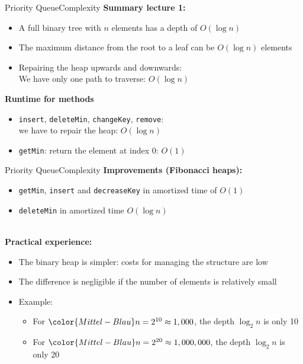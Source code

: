 \begin{frame}{Priority Queue}{Complexity}
  \textbf{Summary lecture 1:}
  \begin{itemize}
    \item<2->
      A full binary tree with {\color{Mittel-Blau}$n$} elements has a {\color{Mittel-Blau}depth} of
      {\color{Mittel-Blau}$O(\log n)$}
    \item<3->
      The maximum distance from the root to a leaf can be
      $O(\log n)$ elements
    \item<4->
      Repairing the heap upwards and downwards:\\
      We have only one path to traverse: {\color{Mittel-Blau}$O(\log n)$}
  \end{itemize}
  \textbf{Runtime for methods}
  \begin{itemize}
    \item<6->
      {\color{Mittel-Blau}\texttt{insert}},
      {\color{Mittel-Blau}\texttt{deleteMin}},
      {\color{Mittel-Blau}\texttt{changeKey}},
      {\color{Mittel-Blau}\texttt{remove}}:\\
      we have to repair the heap: {\color{Mittel-Blau}$O(\log n)$}
    \item<7->
      {\color{Mittel-Blau}\texttt{getMin}}:
      return the element at index 0: {\color{Mittel-Blau}$O(1)$}
  \end{itemize}
\end{frame}


\begin{frame}{Priority Queue}{Complexity}
  \textbf{Improvements (Fibonacci heaps):}
  \begin{itemize}
    \item<2->
      {\color{Mittel-Blau}\texttt{getMin}},
      {\color{Mittel-Blau}\texttt{insert}} and
      {\color{Mittel-Blau}\texttt{decreaseKey}}
      in amortized time of {\color{Mittel-Blau}$O(1)$}
    \item<3->
      {\color{Mittel-Blau}\texttt{deleteMin}}
      in amortized time {\color{Mittel-Blau}$O(\log n)$}
  \end{itemize}
  \hfill\\[0.5em]
  \textbf{Practical experience:}
  \begin{itemize}
    \item<5->
      The binary heap is simpler: costs for managing the structure are low
    \item<6->
      The difference is negligible if the number of elements is relatively small 
    \item<7->
      Example:
    \begin{itemize}
      \item
        For ${\color{Mittel-Blau}n = 2^{10}} \approx 1,000$, the
        {\color{Mittel-Blau}depth}
        $\log_2 n$ is only 10
      \item
        For ${\color{Mittel-Blau}n = 2^{20}} \approx 1,000,000$, the
        {\color{Mittel-Blau}depth}
        $\log_2 n$ is only 20
    \end{itemize}
  \end{itemize}
\end{frame}
